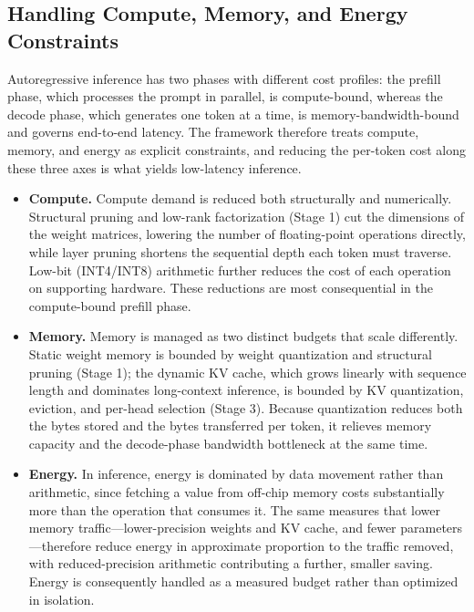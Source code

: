 \documentclass[
11pt, %
english, %
singlespacing, %
headsepline, %
]{MastersDoctoralThesis} %
\begin{document}
\subsection{Handling Compute, Memory, and Energy Constraints}

Autoregressive inference has two phases with different cost profiles: the prefill phase, which processes the prompt in parallel, is compute-bound, whereas the decode phase, which generates one token at a time, is memory-bandwidth-bound and governs end-to-end latency. The framework therefore treats compute, memory, and energy as explicit constraints, and reducing the per-token cost along these three axes is what yields low-latency inference.

\begin{itemize}

  \item \textbf{Compute.} Compute demand is reduced both structurally and numerically. Structural pruning and low-rank factorization (Stage 1) cut the dimensions of the weight matrices, lowering the number of floating-point operations directly, while layer pruning shortens the sequential depth each token must traverse. Low-bit (INT4/INT8) arithmetic further reduces the cost of each operation on supporting hardware. These reductions are most consequential in the compute-bound prefill phase.

  \item \textbf{Memory.} Memory is managed as two distinct budgets that scale differently. Static weight memory is bounded by weight quantization and structural pruning (Stage 1); the dynamic KV cache, which grows linearly with sequence length and dominates long-context inference, is bounded by KV quantization, eviction, and per-head selection (Stage 3). Because quantization reduces both the bytes stored and the bytes transferred per token, it relieves memory capacity and the decode-phase bandwidth bottleneck at the same time.

  \item \textbf{Energy.} In inference, energy is dominated by data movement rather than arithmetic, since fetching a value from off-chip memory costs substantially more than the operation that consumes it. The same measures that lower memory traffic---lower-precision weights and KV cache, and fewer parameters---therefore reduce energy in approximate proportion to the traffic removed, with reduced-precision arithmetic contributing a further, smaller saving. Energy is consequently handled as a measured budget rather than optimized in isolation.

\end{itemize}
\end{document}
